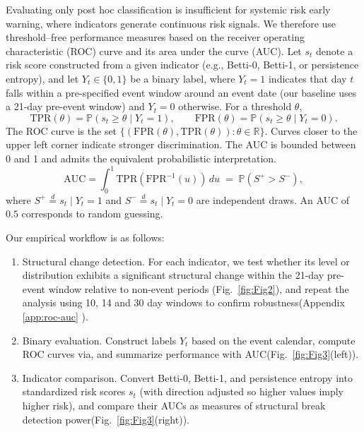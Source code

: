 \documentclass[11pt,reqno]{amsart}
\numberwithin{equation}{section} %
\begin{document}
Evaluating only post hoc classification is insufficient for systemic risk early warning, where indicators generate continuous risk signals\citep{RN5881}. 
We therefore use threshold–free performance measures based on the receiver operating characteristic (ROC) curve and its area under the curve (AUC)\citep{Fawcett2006,Hanley1982}. 
Let \(s_t\) denote a risk score constructed from a given indicator (e.g., Betti-0, Betti-1, or persistence entropy), and let \(Y_t\in\{0,1\}\) be a binary label, where \(Y_t=1\) indicates that day \(t\) falls within a pre-specified event window around an event date (our baseline uses a 21-day pre-event window) and \(Y_t=0\) otherwise. 
For a threshold \(\theta\),
\begin{equation}
\mathrm{TPR}(\theta)=\mathbb{P}(s_t\ge \theta \mid Y_t=1), 
\qquad 
\mathrm{FPR}(\theta)=\mathbb{P}(s_t\ge \theta \mid Y_t=0).
\label{eq:tpr-fpr}
\end{equation}
The ROC curve is the set \(\{(\mathrm{FPR}(\theta),\mathrm{TPR}(\theta)):\theta\in\mathbb{R}\}\). Curves closer to the upper left corner indicate stronger discrimination. The AUC is bounded between 0 and 1 and admits the equivalent probabilistic interpretation.
\begin{equation}
\mathrm{AUC}=\int_{0}^{1}\mathrm{TPR}\!\left(\mathrm{FPR}^{-1}(u)\right)\,du
\;=\; \mathbb{P}\!\left(S^{+}>S^{-}\right),
\label{eq:auc}
\end{equation}
where \(S^{+}\stackrel{d}{=}s_t\mid Y_t=1\) and \(S^{-}\stackrel{d}{=}s_t\mid Y_t=0\) are independent draws. An AUC of \(0.5\) corresponds to random guessing.

Our empirical workflow is as follows:
\begin{enumerate}
  \item Structural change detection. For each indicator, we test whether its level or distribution exhibits a significant structural change within the 21-day pre-event window relative to non-event periods (Fig.~\ref{fig:Fig2}), and repeat the analysis using 10, 14 and 30 day windows to confirm robustness(Appendix \ref{app:roc-auc} ).
  \item Binary evaluation. Construct labels \(Y_t\) based on the event calendar, compute ROC curves via, and summarize performance with AUC(Fig.~\ref{fig:Fig3}(left)).
  \item Indicator comparison. Convert Betti-0, Betti-1, and persistence entropy into standardized risk scores \(s_t\) (with direction adjusted so higher values imply higher risk), and compare their AUCs as measures of structural break detection power(Fig.~\ref{fig:Fig3}(right)).
\end{enumerate}
\end{document}
